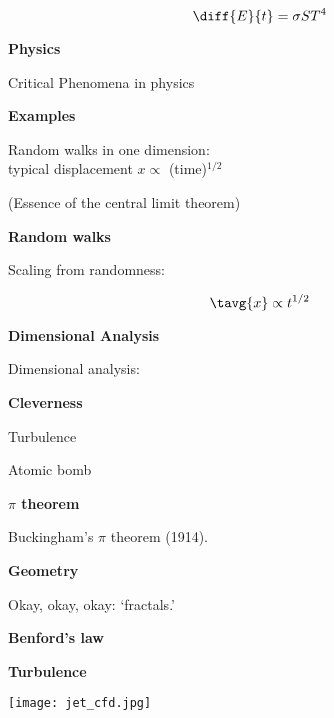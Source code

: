 $$\diff{E}{t} = \sigma S T^4$$



  \textbf{Physics}

Critical Phenomena in physics



  \textbf{Examples}

Random walks in one dimension:\\
typical displacement $x \propto$ (time)$^{1/2}$


(Essence of the central limit theorem)




  \textbf{Random walks}

Scaling from randomness:



$$\tavg{x} \propto t^{1/2}$$



  \textbf{Dimensional Analysis}

Dimensional analysis:


  \textbf{Cleverness}

Turbulence

Atomic bomb


  \textbf{$\pi$ theorem}

Buckingham's $\pi$ theorem (1914).





  \textbf{Geometry}

Okay, okay, okay: `fractals.'



  \textbf{Benford's law}


  \textbf{Turbulence}


\texttt{[image: jet\_cfd.jpg]}

